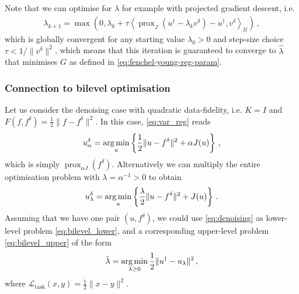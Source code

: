 \noindent Note that we can optimise for $\hat{\lambda}$ for example with projected gradient descent, i.e.
\begin{align*}
    \lambda_{k + 1} = \max\left(0, \lambda_k + \tau \left\langle \operatorname{prox}_J(u^\dagger - \lambda_k v^\delta) - u^\dagger, v^\delta \right\rangle_{\mathcal{U}} \right) \, ,
\end{align*}
which is globally convergent for any starting value $\lambda_0 > 0$ and step-size choice $\tau < 1/\| v^\delta \|^2$, which means that this iteration is guaranteed to converge to $\hat{\lambda}$ that minimises $G$ as defined in \eqref{eq:fenchel-young-reg-param}.

\subsubsection*{Connection to bilevel optimisation}
Let us consider the denoising case with quadratic data-fidelity, i.e. $K = I$ and $F(f, f^\delta) = \frac12 \| f - f^\delta \|^2$. In this case, \eqref{eq:var_reg} reads
\begin{align*}
    u_\alpha^\delta = \operatorname*{arg\,min}_{u} \left\{ \frac{1}{2} \| u - f^\delta \|^2 + \alpha J(u) \right\} \, ,
\end{align*}
which is simply $\operatorname{prox}_{\alpha J}(f^\delta)$. Alternatively we can multiply the entire optimisation problem with $\lambda = \alpha^{-1} > 0$ to obtain
\begin{align}
    u_\lambda^\delta = \operatorname*{arg\,min}_{u} \left\{ \frac{\lambda}{2} \| u - f^\delta \|^2 + J(u) \right\} \, .\label{eq:denoising}
\end{align}
Assuming that we have one pair $(u, f^\delta)$, we could use \eqref{eq:denoising} as lower-level problem \eqref{eq:bilevel_lower}, and a corresponding upper-level problem \eqref{eq:bilevel_upper} of the form 
\begin{align*}
    \hat{\lambda} = \operatorname*{arg\,min}_{\lambda \geq 0} \frac12 \| u^\dagger - u_\lambda \|^2 \, ,
\end{align*}
where $\mathcal{L}_{\text{task}}(x, y) = \frac12 \| x - y \|^2$. 

